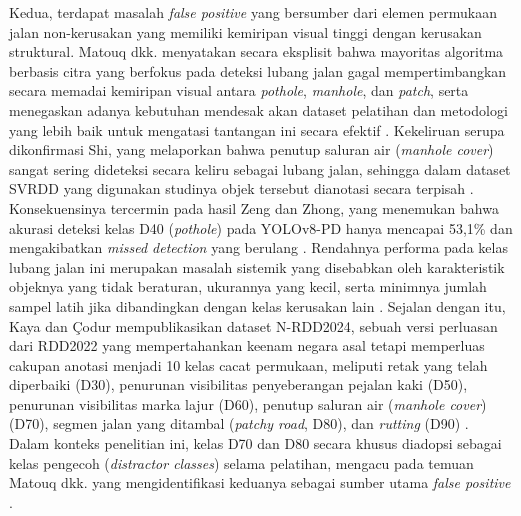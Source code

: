 Kedua, terdapat masalah \textit{false positive} yang bersumber dari elemen
permukaan jalan non-kerusakan yang memiliki kemiripan visual tinggi dengan
kerusakan struktural. Matouq dkk. menyatakan secara eksplisit
bahwa mayoritas algoritma berbasis citra yang berfokus pada deteksi lubang
jalan gagal mempertimbangkan secara memadai kemiripan visual
antara \textit{pothole}, \textit{manhole}, dan \textit{patch}, serta
menegaskan adanya kebutuhan mendesak akan dataset pelatihan dan metodologi
yang lebih baik untuk mengatasi tantangan ini secara efektif
\cite{matouq2024ai}. Kekeliruan serupa dikonfirmasi Shi, yang melaporkan bahwa
penutup saluran air (\textit{manhole cover}) sangat sering dideteksi secara keliru
sebagai lubang jalan, sehingga dalam dataset SVRDD yang digunakan studinya objek
tersebut dianotasi secara terpisah \cite{Shi_2026}. Konsekuensinya tercermin pada hasil Zeng
dan Zhong, yang menemukan bahwa akurasi deteksi kelas D40
(\textit{pothole}) pada YOLOv8-PD hanya mencapai 53,1\% dan mengakibatkan
\textit{missed detection} yang berulang \cite{Zeng2024}. Rendahnya performa
pada kelas lubang jalan ini merupakan masalah sistemik yang disebabkan oleh
karakteristik objeknya yang tidak beraturan, ukurannya yang kecil, serta
minimnya jumlah sampel latih jika dibandingkan dengan kelas kerusakan lain
\cite{Zeng2024}. Sejalan dengan itu, Kaya dan \c{C}odur mempublikasikan
dataset N-RDD2024, sebuah versi perluasan dari RDD2022 yang mempertahankan
keenam negara asal tetapi memperluas cakupan anotasi menjadi 10 kelas cacat
permukaan, meliputi retak yang telah diperbaiki (D30), penurunan visibilitas
penyeberangan pejalan kaki (D50), penurunan visibilitas marka lajur (D60),
penutup saluran air (\textit{manhole cover}) (D70), segmen jalan yang ditambal (\textit{patchy
  road}, D80), dan \textit{rutting} (D90) \cite{kaya2024nrdd2024}. Dalam
konteks penelitian ini, kelas D70 dan D80 secara khusus diadopsi sebagai
kelas pengecoh (\textit{distractor classes}) selama pelatihan, mengacu pada
temuan Matouq dkk. yang mengidentifikasi keduanya sebagai sumber
utama \textit{false positive} \cite{matouq2024ai}.

